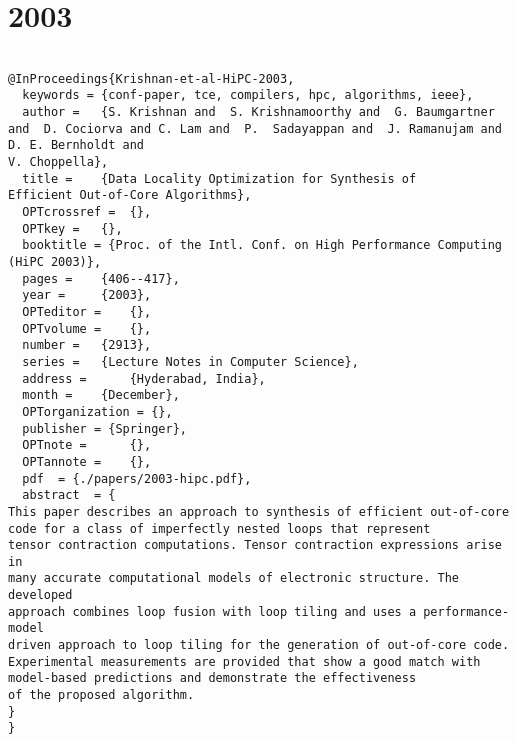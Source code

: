 \documentclass[11pt]{article}
\begin{document}
\section{2003}
\label{sec:orgd37f517}
\lstset{language=bibtex,label= ,caption= ,captionpos=b,numbers=none}
\begin{lstlisting}

@InProceedings{Krishnan-et-al-HiPC-2003,
  keywords = {conf-paper, tce, compilers, hpc, algorithms, ieee},
  author = 	 {S. Krishnan and  S. Krishnamoorthy and  G. Baumgartner and  D. Cociorva and C. Lam and  P.  Sadayappan and  J. Ramanujam and  D. E. Bernholdt and
V. Choppella},
  title = 	 {Data Locality Optimization for Synthesis of
Efficient Out-of-Core Algorithms},
  OPTcrossref =  {},
  OPTkey = 	 {},
  booktitle = {Proc. of the Intl. Conf. on High Performance Computing (HiPC 2003)},
  pages = 	 {406--417},
  year = 	 {2003},
  OPTeditor = 	 {},
  OPTvolume = 	 {},
  number = 	 {2913},
  series = 	 {Lecture Notes in Computer Science},
  address = 	 {Hyderabad, India},
  month = 	 {December},
  OPTorganization = {},
  publisher = {Springer},
  OPTnote = 	 {},
  OPTannote = 	 {},
  pdf  = {./papers/2003-hipc.pdf},
  abstract  = {
This paper describes an approach to synthesis of efficient out-of-core
code for a class of imperfectly nested loops that represent
tensor contraction computations. Tensor contraction expressions arise in
many accurate computational models of electronic structure. The developed
approach combines loop fusion with loop tiling and uses a performance-model
driven approach to loop tiling for the generation of out-of-core code.
Experimental measurements are provided that show a good match with 
model-based predictions and demonstrate the effectiveness
of the proposed algorithm.
}
}



\end{lstlisting}
\end{document}
